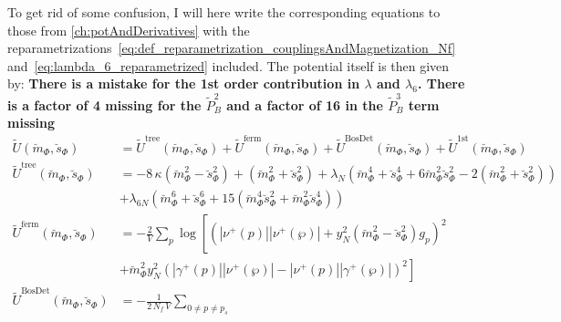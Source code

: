 To get rid of some confusion, I will here write the corresponding equations to those from \ref{ch:potAndDerivatives} with the 
reparametrizations~\eqref{eq:def_reparametrization_couplingsAndMagnetization_Nf} and~\eqref{eq:lambda_6_reparametrized} included. The potential itself is then given by:
\textbf{There is a mistake for the 1st order contribution in $\lambda$ and $\lambda_6$. There is a factor of 4 missing for the $\tilde P_B^2$ and a factor of 16 in the 
$\tilde P_B^3$ term missing}
\begin{align}\label{eq:CEP_shortCut_rescaled}
 \tilde U(\breve m_{\Phi}, \breve s_{\Phi}) &= 
                            \tilde U^{\text{tree}}(\breve m_{\Phi}, \breve s_{\Phi}) + \tilde U^{\text{ferm}}(\breve m_{\Phi}, \breve s_{\Phi})
                          + \tilde U^{\text{BosDet}}(\breve m_{\Phi}, \breve s_{\Phi}) + \tilde U^{\text{1st}}(\breve m_{\Phi}, \breve s_{\Phi})
%                           
              \\ \label{CEP_treeLevel_rescaled}
 \tilde U^{\text{tree}}(\breve m_{\Phi}, \breve s_{\Phi}) & = 
                          - 8\, \kappa \left( \breve m_{\Phi}^2 - \breve s_{\Phi}^2 \right)   +   \left( \breve m_{\Phi}^2 + \breve s_{\Phi}^2 \right)
                          + \lambda_N \left( \breve m_{\Phi}^4 + \breve s_{\Phi}^4 + 6 \breve m_{\Phi}^2 \breve s_{\Phi}^2 
                          - 2 \left(\breve m_{\Phi}^2 + \breve s_{\Phi}^2 \right) \right) 
              \nonumber \\
                        & + \lambda_{6N} \left( \breve m_{\Phi}^6 + \breve s_{\Phi}^6 + 15 \left( \breve m_{\Phi}^4 \breve s_{\Phi}^2 
                          + \breve m_{\Phi}^2 \breve s_{\Phi}^4 \right)   \right)
%                           
              \\ \label{eq:CEP_ferionicContribution_rescaled}
 \tilde U^{\text{ferm}}(\breve m_{\Phi}, \breve s_{\Phi}) & = 
                          - \frac{2}{V} \sum\limits_p \log \left[ \left( |\nu^+(p)| |\nu^+(\wp)|   +
                           y_N^2 \left( \breve m_{\Phi}^2 - \breve s_{\Phi}^2 \right) g_p\right)^2  \right.
               \nonumber \\ 
                        & + \left. \breve m_{\Phi}^2 y_N^2 \left( |\gamma^+(p)| |\nu^+(\wp)|   -   |\nu^+(p)| |\gamma^+(\wp)| \right)^2\right] 
%                         
               \\ \label{eq:CEP_bosonicDeterminantContribution_rescaled}
 \tilde U^{\text{BosDet}}(\breve m_{\Phi}, \breve s_{\Phi}) & = 
                          - \frac{1}{2\,N_f\,V}\sum\limits_{0 \neq p \neq p_s} 

\end{align}
